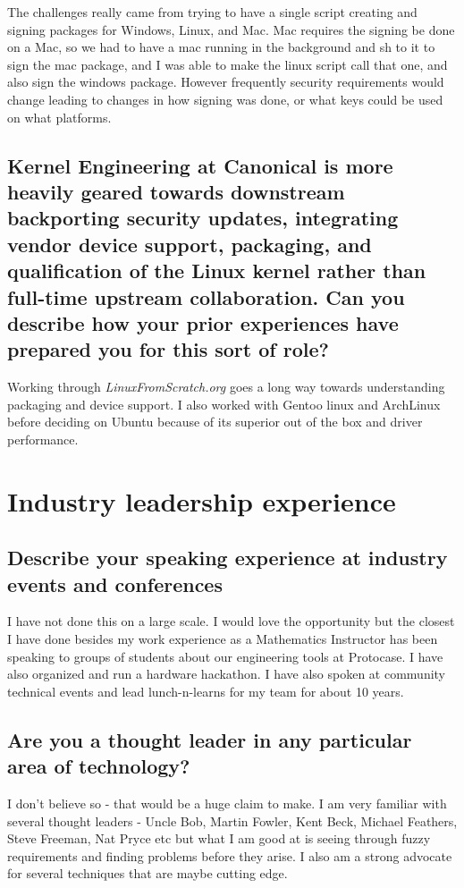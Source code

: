 \documentclass[letter,12pt]{article}
\begin{document}
The challenges really came from trying to have a single script creating and signing packages for Windows, Linux, and Mac. Mac requires the signing be done on a Mac, so we had to have a mac running in the background and sh to it to sign the mac package, and I was able to make the linux script call that one, and also sign the windows package. However frequently security requirements would change leading to changes in how signing was done, or what keys could be used on what platforms.

\subsection{Kernel Engineering at Canonical is more heavily geared towards downstream backporting security updates, integrating vendor device support, packaging, and qualification of the Linux kernel rather than full-time upstream collaboration.  Can you describe how your prior experiences have prepared you for this sort of role?}
Working through \textit{LinuxFromScratch.org} goes a long way towards understanding packaging and device support. I also worked with Gentoo linux and ArchLinux before deciding on Ubuntu because of its superior out of the box and driver performance.

\section{Industry leadership experience}

\subsection{Describe your speaking experience at industry events and conferences}
I have not done this on a large scale. I would love the opportunity but the closest I have done besides my work experience as a Mathematics Instructor has been speaking to groups of students about our engineering tools at Protocase. I have also organized and run a hardware hackathon. I have also spoken at community technical events and lead lunch-n-learns for my team for about 10 years.

\subsection{Are you a thought leader in any particular area of technology?}
I don't believe so - that would be a huge claim to make. I am very familiar with several thought leaders - Uncle Bob, Martin Fowler, Kent Beck, Michael Feathers, Steve Freeman, Nat Pryce etc but what I am good at is seeing through fuzzy requirements and finding problems before they arise. I also am a strong advocate for several techniques that are maybe cutting edge.
\end{document}
